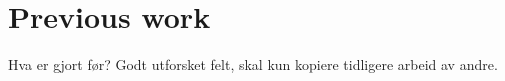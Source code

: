 \section{Previous work}
\label{prevwork}
Hva er gjort før? Godt utforsket felt, skal kun kopiere tidligere arbeid av andre.